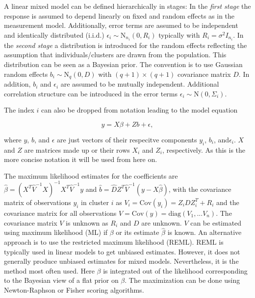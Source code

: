 \documentclass[12pt]{article}
\begin{document}
A linear mixed model can be defined hierarchically in stages: 
In the \textit{first stage} the response is assumed to depend linearly on fixed and random effects as in the measurement model. Additionally, error terms are assumed to be independent and identically distributed (i.i.d.) $\epsilon_i \sim \mathrm{N}_{n_i}(0,R_i)$ typically with $R_i=\sigma^2 I_{n_i}$. 
In the \textit{second stage} a distribution is introduced for the random effects reflecting the assumption that individuals/clusters are drawn from the population.
This distribution can be seen as a Bayesian prior. The convention is to use Gaussian random effects $b_i \sim \mathrm{N}_q(0,D)$ with $(q{+}1)\times (q{+}1)$ covariance matrix $D$. In addition, $b_i$ and $\epsilon_i$ are assumed to be mutually independent. 
Additional correlation structure can be introduced in the error terms $\epsilon_i \sim \mathrm{N}(0, \Sigma_i)$.

The index $i$ can also be dropped from notation leading to the model equation 

$$y = X \beta + Z b + \epsilon,$$

where $y$, $b$, and $\epsilon$ are just vectors of their respecitve components $y_i$, $b_i$, and$\epsilon_i$. $X$ and $Z$ are matrices made up or their rows $X_i$ and $Z_i$, respectively. As this is the more concise notation it will be used from here on.

The maximum likelihood estimates for the coefficients are $\hat{\beta} = (X^T \hat{V}^{-1} X)^{-1} X^T \hat{V}^{-1}y$ and $\hat{b} = \hat{D}Z^T\hat{V}^{-1} (y-X\hat{\beta})$, with the covariance matrix of observations $y_i$ in cluster $i$ as $V_i = \mathrm{Cov}(y_i) = Z_iDZ_i^T + R_i$ and the covariance matrix for all observations $V = \mathrm{Cov}(y) = \mathrm{diag}(V_1,...V_n)$.
The covariance matrix $V$ is unknown as $R_i$ and $D$ are unknown. $V$ can be estimated  using maximum likelihood (ML) if $\beta$ or its estimate $\hat{\beta}$ is known. An alternative approach is to use the restricted  maximum likelihood  (REML). REML is typically used in linear models to get unbiased estimates. However, it does not generally produce unbiased estimates for mixed models. Nevertheless, it is the method most often used. Here $\beta$ is integrated out of the likelihood corresponding to the Bayesian view of a flat prior on $\beta$. The maximization can be done using Newton-Raphson or Fisher scoring algorithms. 
\end{document}
